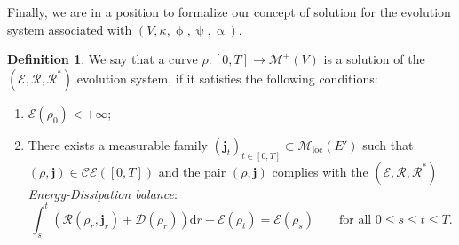 \documentclass[11pt,reqno]{amsart}
\numberwithin{equation}{section}
\newcommand{\CE}[2]{\calC \calE([#1,#2])}
\newcommand{\calC}{\mathcal{C}}
\newcommand{\calE}{\mathcal{E}}
\newcommand{\calM}{\mathcal{M}}
\newcommand{\calR}{\mathcal{R}}
\newcommand{\dd}{\mathrm{d}}
\theoremstyle{definition}
\newtheorem{definition}[theorem]{Definition}
\def\dd{\mathrm{d}}
\newcommand{\Fish}{\mathscr{D}}
\newcommand{\pinfty}{{+\infty}}
\def\calS{\mathscr E}
\def\calR{\mathscr R}
\newcommand{\bj}{{\boldsymbol j}}
\newcommand{\scrR}{\mathscr{R}}
\newcommand{\scrE}{\mathscr{E}}
\newcommand{\Ed}{{E'}}
\newcommand{\Mloc}{\mathcal{M}_{\mathrm{loc}}}
\newcommand{\RNEW}{\color{black}} %
\newcommand{\TODOBS}[1]{\todo[inline, color=red!40]{#1}}
\newcommand{\TODO}[1]{\todo[inline, color=cyan!20]{#1}}
\newcommand{\EEE}{\color{black}}
\numberwithin{equation}{section}
\begin{document}


Finally, we are in a position to formalize our concept of solution for the evolution system associated with 
$(V,\kappa,\upphi,\uppsi,\upalpha)$. 
\begin{definition} %
\label{def:R-Rstar-balance}
We say that a 
curve $\rho: [0,T] \to \calM^+(V)$ is a  solution
of the $(\scrE,\scrR,\scrR^*)$ evolution system,
if it
 satisfies the following conditions:
\begin{enumerate}
\item $\calS(\rho_0)<\pinfty$;
\item There exists a measurable family $(\bj_t)_{t\in [0,T]} \subset \Mloc(\Ed)$
such that $(\rho,\bj)\in \CE0T$ \RNEW and the pair $(\rho,\bj)$ complies with the  {\em $(\scrE,\scrR,\scrR^*)$
  Energy-Dissipation balance}:  \EEE
\begin{equation}
\label{R-Rstar-balance}
\int_s^t \left( \scrR(\rho_r, \bj_r) + \Fish(\rho_r) \right) \dd r+ \calS(\rho_t)   = \calS(\rho_s)   \qquad \text{for all } 0 \leq s \leq t \leq T.
\end{equation}
\end{enumerate}
\end{definition}



\end{document}
